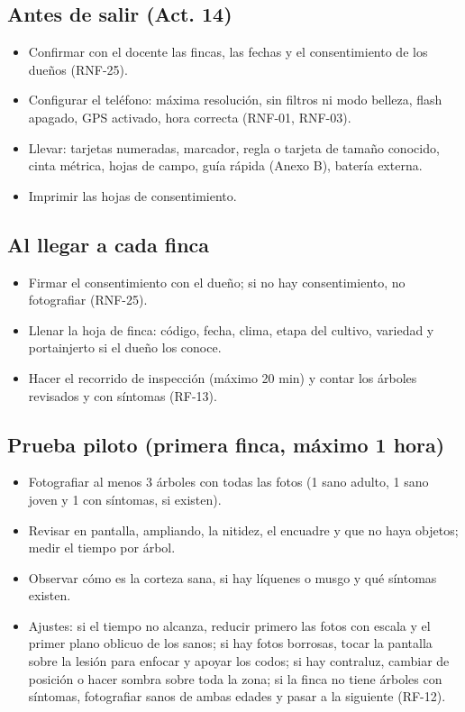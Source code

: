 \documentclass[11pt]{article}
\begin{document}
\subsection{Antes de salir (Act. 14)}
\begin{itemize}[leftmargin=1.2em,itemsep=2pt,topsep=2pt]
\item Confirmar con el docente las fincas, las fechas y el consentimiento de los dueños (RNF-25).
\item Configurar el teléfono: máxima resolución, sin filtros ni modo belleza, flash apagado, GPS activado, hora correcta (RNF-01, RNF-03).
\item Llevar: tarjetas numeradas, marcador, regla o tarjeta de tamaño conocido, cinta métrica, hojas de campo, guía rápida (Anexo B), batería externa.
\item Imprimir las hojas de consentimiento.
\end{itemize}
\subsection{Al llegar a cada finca}
\begin{itemize}[leftmargin=1.2em,itemsep=2pt,topsep=2pt]
\item Firmar el consentimiento con el dueño; si no hay consentimiento, no fotografiar (RNF-25).
\item Llenar la hoja de finca: código, fecha, clima, etapa del cultivo, variedad y portainjerto si el dueño los conoce.
\item Hacer el recorrido de inspección (máximo 20 min) y contar los árboles revisados y con síntomas (RF-13).
\end{itemize}
\subsection{Prueba piloto (primera finca, máximo 1 hora)}
\begin{itemize}[leftmargin=1.2em,itemsep=2pt,topsep=2pt]
\item Fotografiar al menos 3 árboles con todas las fotos (1 sano adulto, 1 sano joven y 1 con síntomas, si existen).
\item Revisar en pantalla, ampliando, la nitidez, el encuadre y que no haya objetos; medir el tiempo por árbol.
\item Observar cómo es la corteza sana, si hay líquenes o musgo y qué síntomas existen.
\item Ajustes: si el tiempo no alcanza, reducir primero las fotos con escala y el primer plano oblicuo de los sanos; si hay fotos borrosas, tocar la pantalla sobre la lesión para enfocar y apoyar los codos; si hay contraluz, cambiar de posición o hacer sombra sobre toda la zona; si la finca no tiene árboles con síntomas, fotografiar sanos de ambas edades y pasar a la siguiente (RF-12).
\end{itemize}
\end{document}
